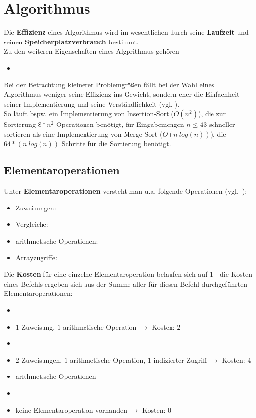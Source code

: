 \section{Algorithmus}

Die \textbf{Effizienz} eines Algorithmus wird im wesentlichen durch seine \textbf{Laufzeit} und seinen \textbf{Speicherplatzverbrauch} bestimmt.\\

\noindent
Zu den weiteren Eigenschaften eines Algprithmus gehören

\begin{itemize}
    \item
\end{itemize}

\noindent
Bei der Betrachtung kleinerer Problemgrößen fällt bei der Wahl eines Algorithmus weniger seine Effizienz ins Gewicht, sondern eher die Einfachheit seiner Implementierung und seine Verständlichkeit (vgl. \cite[5 f.]{GD18a}).\\
So läuft bspw. ein Implementierung von Insertion-Sort ($O(n^2)$), die zur Sortierung $8*n^2$ Operationen benötigt, für Eingabemengen $n \leq 43$ schneller sortieren als eine Implementierung von Merge-Sort ($O(n\ log(n))$), die $64 * (n\ log(n))$ Schritte für die Sortierung benötigt.


\subsection{Elementaroperationen}

Unter \textbf{Elementaroperationen} versteht man u.a. folgende Operationen (vgl.~\cite[6]{GD18a}):

\begin{itemize}
    \item Zuweisungen: 
    \item Vergleiche: 
    \item arithmetische Operationen: 
    \item Arrayzugriffe: 
\end{itemize}

Die \textbf{Kosten} für eine einzelne Elementaroperation belaufen sich auf $1$ - die Kosten eines Befehls ergeben sich aus der Summe aller für diesen Befehl durchgeführten Elementaroperationen:


\begin{itemize}
    \item {}
    \item[] $1$ Zuweisung, $1$ arithmetische Operation $\rightarrow$ Kosten: $2$
    \item {}
    \item[] $2$ Zuweisungen, $1$ arithmetische Operation, $1$ indizierter Zugriff $\rightarrow$ Kosten: $4$
    \item arithmetische Operationen 
    \item {}
    \item[] keine Elementaroperation vorhanden $\rightarrow$ Kosten: $0$
\end{itemize}


